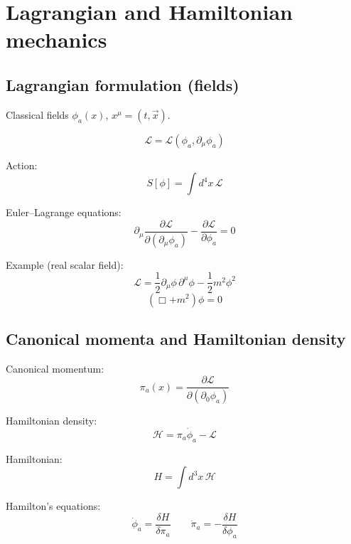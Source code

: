 \documentclass{article}
\begin{document}
\section{Lagrangian and Hamiltonian mechanics}

\subsection{Lagrangian formulation (fields)}
Classical fields \(\phi_a(x)\), \(x^\mu = (t,\vec{x})\).

\begin{equation*}
    \mathcal{L} = \mathcal{L}\!\left(\phi_a,\partial_\mu\phi_a\right)
\end{equation*}

Action:
\begin{equation*}
    S[\phi] = \int d^4x\,\mathcal{L}
\end{equation*}

Euler--Lagrange equations:
\begin{equation*}
    \partial_\mu\frac{\partial\mathcal{L}}{\partial(\partial_\mu\phi_a)}
    - \frac{\partial\mathcal{L}}{\partial\phi_a} = 0
\end{equation*}

Example (real scalar field):
\begin{equation*}
    \mathcal{L} = \frac{1}{2}\partial_\mu\phi\,\partial^\mu\phi
    - \frac{1}{2}m^2\phi^2
\end{equation*}
\begin{equation*}
    (\Box + m^2)\phi = 0
\end{equation*}

\subsection{Canonical momenta and Hamiltonian density}
Canonical momentum:
\begin{equation*}
    \pi_a(x) = \frac{\partial\mathcal{L}}{\partial(\partial_0\phi_a)}
\end{equation*}

Hamiltonian density:
\begin{equation*}
    \mathcal{H} = \pi_a\dot\phi_a - \mathcal{L}
\end{equation*}

Hamiltonian:
\begin{equation*}
    H = \int d^3x\,\mathcal{H}
\end{equation*}

Hamilton's equations:
\begin{equation*}
    \dot\phi_a = \frac{\delta H}{\delta \pi_a}
    \qquad
    \dot\pi_a = -\frac{\delta H}{\delta \phi_a}
\end{equation*}
\end{document}
